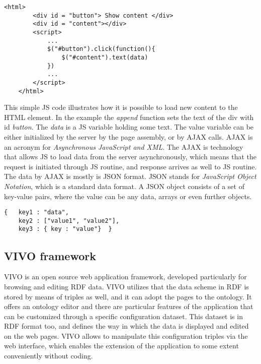 \begin{lstlisting}[captionpos=b, caption=JavaScript routine assigned to an HTML element, label=jsListing, belowskip=1em, aboveskip=2em,
basicstyle=\footnotesize,frame=single]
	<html>
		<div id = "button"> Show content </div>
		<div id = "content"></div>
		<script>
			...
			$("#button").click(function(){
				$("#content").text(data)
			})
			...	
		</script>
	</html>
\end{lstlisting}


This simple JS code illustrates how it is possible to load new content to the HTML element. In the example the \textit{append} function sets the text of the div with id \textit{button}. The \textit{data} is a JS variable holding
some text. The value variable can be either initialized by the server by the page assembly, or by AJAX calls. AJAX is an acronym for \textit{Asynchronous JavaScript and XML}. The AJAX is technology that allows JS to load data from the server asynchronously, which means that the request is initiated through JS routine, and response arrives as well to JS routine. The data by AJAX is mostly is JSON format. JSON stands for \textit{JavaScript Object Notation}, which is a standard data format. A JSON object consists of a set of key-value pairs, where the value can be any data, arrays or even further objects.

\begin{lstlisting}[captionpos=b, caption=JSON object example, label=jsListing, belowskip=1em, aboveskip=2em,
basicstyle=\footnotesize,frame=single]
{	key1 : "data",
	key2 : ["value1", "value2"],
	key3 : { key : "value"}  }
\end{lstlisting}


\subsection{VIVO framework} \label{vivo}


VIVO is an open source web application framework, developed particularly for browsing and editing RDF data. VIVO utilizes that the data scheme in RDF is stored by means of triples as well, and it can adopt the pages to the ontology. It offers an ontology editor and there are particular features of the application that can be customized through a specific configuration dataset. This dataset is in RDF format too, and defines the way in which the data is displayed and edited on the web pages. VIVO allows to manipulate this configuration triples via the web interface, which enables the extension of the application to some extent conveniently without coding.

